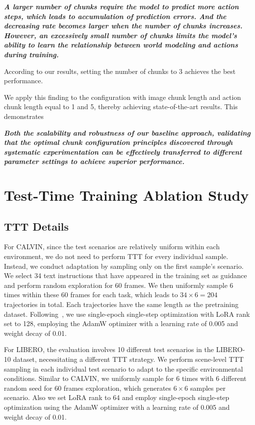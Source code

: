\textbf{\textit{A larger number of chunks require the model to predict more action steps, which leads to accumulation of prediction errors. And the decreasing rate becomes larger when the number of chunks increases. However, an excessively small number of chunks limits the model's ability to learn the relationship between world modeling and actions during training.}} 

According to our results, setting the number of chunks to 3 achieves the best performance.

We apply this finding to the configuration with image chunk length and action chunk length equal to 1 and 5, thereby achieving state-of-the-art results. This demonstrates

\textbf{\textit{Both the scalability and robustness of our baseline approach, validating that the optimal chunk configuration principles discovered through systematic experimentation can be effectively transferred to different parameter settings to achieve superior performance.}}

\section{Test-Time Training Ablation Study}

\subsection{TTT Details}
\label{app:ttt_details}

For CALVIN, since the test scenarios are relatively uniform within each environment, we do not need to perform TTT for every individual sample. Instead, we conduct adaptation by sampling only on the first sample's scenario. We select 34 text instructions that have appeared in the training set as guidance and perform random exploration for 60 frames. We then uniformly sample 6 times within these 60 frames for each task, which leads to $34\times6=204$ trajectories in total. Each trajectories have the same length as the pretraining dataset. Following~\cite{kojima2025loratttlowranktesttimetraining}, we use single-epoch single-step optimization with LoRA rank set to 128, employing the AdamW optimizer with a learning rate of 0.005 and weight decay of 0.01.

For LIBERO, the evaluation involves 10 different test scenarios in the LIBERO-10 dataset, necessitating a different TTT strategy. We perform scene-level TTT sampling in each individual test scenario to adapt to the specific environmental conditions. Similar to CALVIN,  we uniformly sample for 6 times with 6 different random seed for 60 frames exploration, which generates $6 \times 6$ samples per scenario. Also we set LoRA rank to 64 and  employ single-epoch single-step optimization using the AdamW optimizer with a learning rate of 0.005 and weight decay of 0.01.


